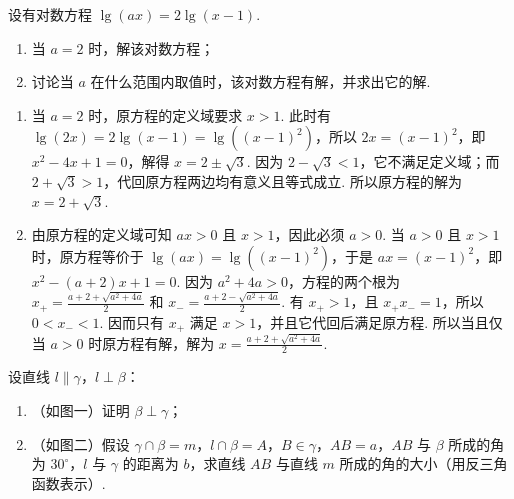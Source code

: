 \documentclass[UTF8,a4paper,oneside,11pt]{ctexbook}
\begin{document}
\begin{problem}

设有对数方程 \(\lg(ax)=2\lg(x-1)\).

\begin{enumerate}
\item 当 \(a = 2\) 时，解该对数方程；
\item 讨论当 \(a\) 在什么范围内取值时，该对数方程有解，并求出它的解.
\end{enumerate}
\end{problem}

\begin{solution}
\begin{enumerate}
\item 当 \(a=2\) 时，原方程的定义域要求 \(x>1\). 此时有 \(\lg(2x)=2\lg(x-1)=\lg\left((x-1)^2\right)\)，所以 \(2x=(x-1)^2\)，即 \(x^2-4x+1=0\)，解得 \(x=2\pm\sqrt{3}\). 因为 \(2-\sqrt{3}<1\)，它不满足定义域；而 \(2+\sqrt{3}>1\)，代回原方程两边均有意义且等式成立. 所以原方程的解为 \(x=2+\sqrt{3}\).
\item 由原方程的定义域可知 \(ax>0\) 且 \(x>1\)，因此必须 \(a>0\). 当 \(a>0\) 且 \(x>1\) 时，原方程等价于 \(\lg(ax)=\lg\left((x-1)^2\right)\)，于是 \(ax=(x-1)^2\)，即 \(x^2-(a+2)x+1=0\). 因为 \(a^2+4a>0\)，方程的两个根为 \(x_+=\frac{a+2+\sqrt{a^2+4a}}{2}\) 和 \(x_-=\frac{a+2-\sqrt{a^2+4a}}{2}\). 有 \(x_+>1\)，且 \(x_+x_-=1\)，所以 \(0<x_-<1\). 因而只有 \(x_+\) 满足 \(x>1\)，并且它代回后满足原方程. 所以当且仅当 \(a>0\) 时原方程有解，解为 \(x=\frac{a+2+\sqrt{a^2+4a}}{2}\).
\end{enumerate}
\end{solution}

\begin{problem}

设直线 \(l \parallel \gamma\)，\(l \perp \beta\)：

\begin{enumerate}
\item （如图一）证明 \(\beta \perp \gamma\)；
\item （如图二）假设 \(\gamma \cap \beta = m\)，\(l \cap \beta = A\)，\(B \in \gamma\)，\(AB = a\)，\(AB\) 与 \(\beta\) 所成的角为 \(30^\circ\)，\(l\) 与 \(\gamma\) 的距离为 \(b\)，求直线 \(AB\) 与直线 \(m\) 所成的角的大小（用反三角函数表示）.


\end{enumerate}



\end{problem}
\end{document}
